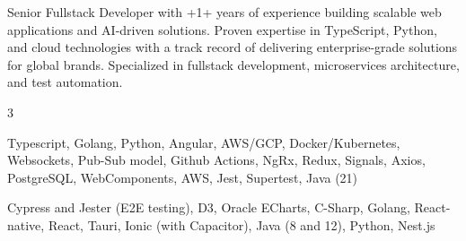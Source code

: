 \documentclass[9pt]{developercv}%
\begin{document}
	\begin{minipage}[t]{0.45\textwidth} %
		\vspace{-\baselineskip}

		Senior Fullstack Developer with \number\numexpr{}+1\relax+ years of
		experience building scalable web applications and AI-driven solutions. Proven
		expertise in TypeScript, Python, and cloud technologies with a track record of
		delivering enterprise-grade solutions for global brands. Specialized in
		fullstack development, microservices architecture, and test automation.
	\end{minipage}
	\hfill
	\begin{minipage}[t]{0.45\textwidth}
		\vspace{-\baselineskip}

		\begin{barchart}
			{3}



		\end{barchart}
	\end{minipage}

	\vspace{1.0cm}

	\begin{minipage}[t]{0.45\textwidth}
		\vspace{-\baselineskip}

		Typescript, Golang, Python, Angular, AWS/GCP, Docker/Kubernetes, Websockets,
		Pub-Sub model, Github Actions, NgRx, Redux, Signals, Axios, PostgreSQL, WebComponents,
		AWS, Jest, Supertest, Java (21)
	\end{minipage}
	\hfill
	\begin{minipage}[t]{0.45\textwidth}
		\vspace{-\baselineskip}

		Cypress and Jester (E2E testing), D3, Oracle ECharts, C-Sharp, Golang, React-native,
		React, Tauri, Ionic (with Capacitor), Java (8 and 12), Python, Nest.js
	\end{minipage}
	\vspace{1.0cm}
\end{document}

